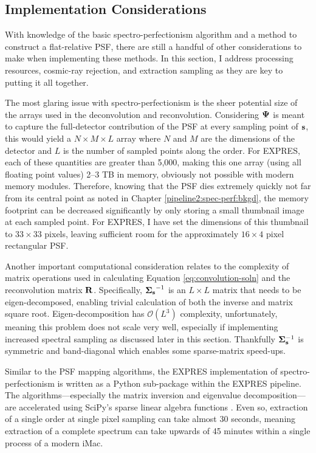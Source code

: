 \subsection{Implementation Considerations}

With knowledge of the basic spectro-perfectionism algorithm and a method to construct a flat-relative PSF, there are still a handful of other considerations to make when implementing these methods. In this section, I address processing resources, cosmic-ray rejection, and extraction sampling as they are key to putting it all together.

The most glaring issue with spectro-perfectionism is the sheer potential size of the arrays used in the deconvolution and reconvolution. Considering $\vb{\Psi}$ is meant to capture the full-detector contribution of the PSF at every sampling point of $\vb{s}$, this would yield a $N \times M \times L$ array where $N$ and $M$ are the dimensions of the detector and $L$ is the number of sampled points along the order. For EXPRES, each of these quantities are greater than 5,000, making this one array (using all floating point values) 2--3 TB in memory, obviously not possible with modern memory modules. Therefore, knowing that the PSF dies extremely quickly not far from its central point as noted in Chapter \ref{pipeline2:spec-perf:bkgd}, the memory footprint can be decreased significantly by only storing a small thumbnail image at each sampled point. For EXPRES, I have set the dimensions of this thumbnail to $33 \times 33$ pixels, leaving sufficient room for the approximately $16 \times 4$ pixel rectangular PSF.

Another important computational consideration relates to the complexity of matrix operations used in calculating Equation \ref{eq:convolution-soln} and the reconvolution matrix $\vb{R}$. Specifically, $\vb{\Sigma_s}^{-1}$ is an $L \times L$ matrix that needs to be eigen-decomposed, enabling trivial calculation of both the inverse and matrix square root. Eigen-decomposition has $\mathcal{O}(L^3)$ complexity, unfortunately, meaning this problem does not scale very well, especially if implementing increased spectral sampling as discussed later in this section. Thankfully $\vb{\Sigma}_{\vb{s}}^{-1}$ is symmetric and band-diagonal which enables some sparse-matrix speed-ups.

Similar to the PSF mapping algorithms, the EXPRES implementation of spectro-perfectionism is written as a Python sub-package within the EXPRES pipeline. The algorithms---especially the matrix inversion and eigenvalue decomposition---are accelerated using SciPy's sparse linear algebra functions \citep{virtanen_scipy_2020}. Even so, extraction of a single order at single pixel sampling can take almost 30 seconds, meaning extraction of a complete spectrum can take upwards of 45 minutes within a single process of a modern iMac.

